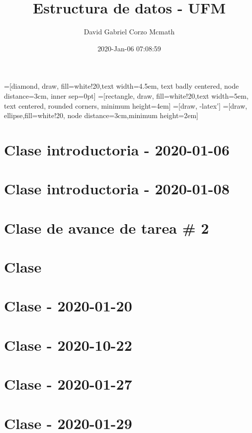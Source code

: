 \documentclass{book}
\title{Estructura de datos - UFM}
\author{David Gabriel Corzo Mcmath}
\date{2020-Jan-06 07:08:59}
\begin{document}
\maketitle
\tableofcontents

=[diamond, draw, fill=white!20,text width=4.5em, text badly centered, node distance=3cm, inner sep=0pt]
=[rectangle, draw, fill=white!20,text width=5em, text centered, rounded corners, minimum height=4em]
=[draw, -latex']
=[draw, ellipse,fill=white!20, node distance=3cm,minimum height=2em]


\chapter{Clase introductoria - 2020-01-06}


\chapter{Clase introductoria - 2020-01-08}


\chapter{Clase de avance de tarea \# 2}


\chapter{Clase }


\chapter{Clase - 2020-01-20}


\chapter{Clase - 2020-10-22}



\chapter{Clase - 2020-01-27}


\chapter{Clase - 2020-01-29}

\end{document}

